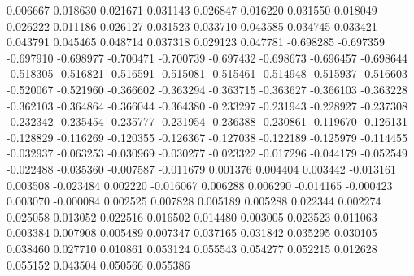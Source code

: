 0.006667
0.018630
0.021671
0.031143
0.026847
0.016220
0.031550
0.018049
0.026222
0.011186
0.026127
0.031523
0.033710
0.043585
0.034745
0.033421
0.043791
0.045465
0.048714
0.037318
0.029123
0.047781
-0.698285
-0.697359
-0.697910
-0.698977
-0.700471
-0.700739
-0.697432
-0.698673
-0.696457
-0.698644
-0.518305
-0.516821
-0.516591
-0.515081
-0.515461
-0.514948
-0.515937
-0.516603
-0.520067
-0.521960
-0.366602
-0.363294
-0.363715
-0.363627
-0.366103
-0.363228
-0.362103
-0.364864
-0.366044
-0.364380
-0.233297
-0.231943
-0.228927
-0.237308
-0.232342
-0.235454
-0.235777
-0.231954
-0.236388
-0.230861
-0.119670
-0.126131
-0.128829
-0.116269
-0.120355
-0.126367
-0.127038
-0.122189
-0.125979
-0.114455
-0.032937
-0.063253
-0.030969
-0.030277
-0.023322
-0.017296
-0.044179
-0.052549
-0.022488
-0.035360
-0.007587
-0.011679
0.001376
0.004404
0.003442
-0.013161
0.003508
-0.023484
0.002220
-0.016067
0.006288
0.006290
-0.014165
-0.000423
0.003070
-0.000084
0.002525
0.007828
0.005189
0.005288
0.022344
0.002274
0.025058
0.013052
0.022516
0.016502
0.014480
0.003005
0.023523
0.011063
0.003384
0.007908
0.005489
0.007347
0.037165
0.031842
0.035295
0.030105
0.038460
0.027710
0.010861
0.053124
0.055543
0.054277
0.052215
0.012628
0.055152
0.043504
0.050566
0.055386
